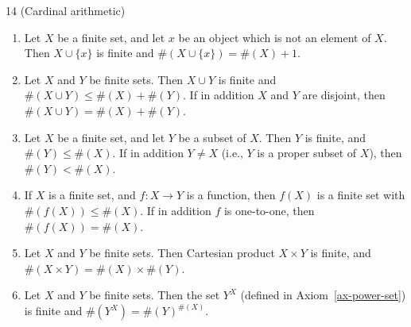 \begin{proposition}{14}
    \label{cardinal-arithmetic}
    (Cardinal arithmetic)
    \begin{enumerate}
        \item Let $X$ be a finite set, and let $x$ be an object which is not an element of $X$. Then $X\cup \{x\}$ is
        finite and $\#(X\cup \{x\}) = \#(X) + 1$.
        \item Let $X$ and $Y$ be finite sets. Then $X\cup Y$ is finite and $\#(X\cup Y) \leq \#(X) + \#(Y)$. If in
        addition $X$ and $Y$ are disjoint, then $\#(X\cup Y) = \#(X) + \#(Y)$.
        \item Let $X$ be a finite set, and let $Y$ be a subset of $X$. Then $Y$ is finite, and $\#(Y)\leq \#(X)$. If
        in addition $Y\neq X$ (i.e., $Y$ is a proper subset of $X$), then $\#(Y) < \#(X)$.
        \item If $X$ is a finite set, and $f: X\rightarrow Y$ is a function, then $f(X)$ is a finite set with
        $\#(f(X))\leq \#(X)$. If in addition $f$ is one-to-one, then $\#(f(X)) = \#(X)$.
        \item Let $X$ and $Y$ be finite sets. Then Cartesian product $X\times Y$ is finite, and
        $\#(X\times Y) = \#(X)\times \#(Y)$.
        \item Let $X$ and $Y$ be finite sets. Then the set $Y^X$ (defined in Axiom~\ref{ax-power-set}) is finite and
        $\#(Y^X) = \#(Y)^{\#(X)}$.
    \end{enumerate}
\end{proposition}

